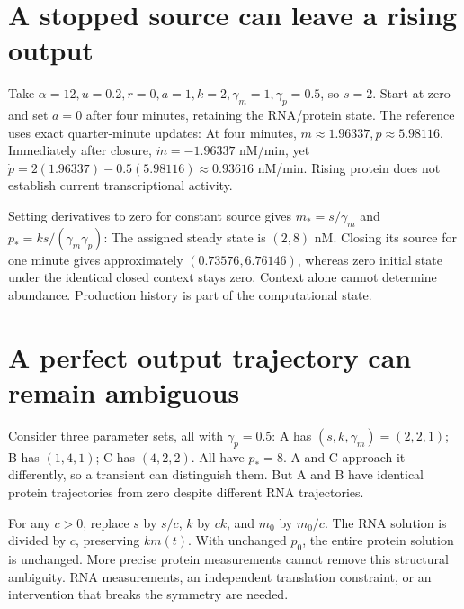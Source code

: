 \section{A stopped source can leave a rising output}
Take $\alpha=12,u=0.2,r=0,a=1,k=2,\gamma_m=1,\gamma_p=0.5$,
so $s=2$. Start at zero and set $a=0$ after four minutes, retaining
the RNA/protein state. The reference uses exact quarter-minute updates:
At four minutes, $m\approx1.96337,p\approx5.98116$. Immediately after
closure, $\dot m=-1.96337$ nM/min, yet
$\dot p=2(1.96337)-0.5(5.98116)\approx0.93616$ nM/min.
Rising protein does not establish current transcriptional activity.

Setting derivatives to zero for constant source gives
$m_*=s/\gamma_m$ and $p_*=ks/(\gamma_m\gamma_p)$:
The assigned steady state is $(2,8)$ nM. Closing its source for one minute
gives approximately $(0.73576,6.76146)$, whereas zero initial state under
the identical closed context stays zero. Context alone cannot determine
abundance. Production history is part of the computational state.

\section{A perfect output trajectory can remain ambiguous}
Consider three parameter sets, all with $\gamma_p=0.5$:
A has $(s,k,\gamma_m)=(2,2,1)$; B has $(1,4,1)$; C has $(4,2,2)$.
All have $p_*=8$. A and C approach it differently, so a transient can
distinguish them. But A and B have identical protein trajectories from
zero despite different RNA trajectories.
\begin{center}\end{center}
For any $c>0$, replace $s$ by $s/c$, $k$ by $ck$, and $m_0$ by $m_0/c$.
The RNA solution is divided by $c$, preserving $km(t)$.
With unchanged $p_0$, the entire protein solution is unchanged.
More precise protein measurements cannot remove this structural ambiguity.
RNA measurements, an independent translation constraint, or an intervention
that breaks the symmetry are needed.

